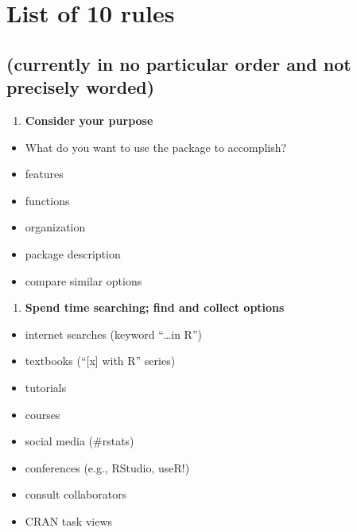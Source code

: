 \documentclass[10pt,letterpaper]{article}
\providecommand{\tightlist}{%
  \setlength{\itemsep}{0pt}\setlength{\parskip}{0pt}}
\begin{document}
\hypertarget{list-of-10-rules}{%
\section{List of 10 rules}\label{list-of-10-rules}}

\hypertarget{currently-in-no-particular-order-and-not-precisely-worded}{%
\subsection{(currently in no particular order and not precisely
worded)}\label{currently-in-no-particular-order-and-not-precisely-worded}}

\begin{enumerate}
\def\labelenumi{\arabic{enumi}.}
\tightlist
\item
  \textbf{Consider your purpose}
\end{enumerate}

\begin{itemize}
\tightlist
\item
  What do you want to use the package to accomplish?
\item
  features
\item
  functions
\item
  organization
\item
  package description
\item
  compare similar options
\end{itemize}

\begin{enumerate}
\def\labelenumi{\arabic{enumi}.}
\setcounter{enumi}{1}
\tightlist
\item
  \textbf{Spend time searching; find and collect options}
\end{enumerate}

\begin{itemize}
\tightlist
\item
  internet searches (keyword ``\ldots{}in R'')
\item
  textbooks (``{[}x{]} with R'' series)
\item
  tutorials
\item
  courses
\item
  social media (\#rstats)
\item
  conferences (e.g., RStudio, useR!)
\item
  consult collaborators
\item
  CRAN task views
\end{itemize}
\end{document}
